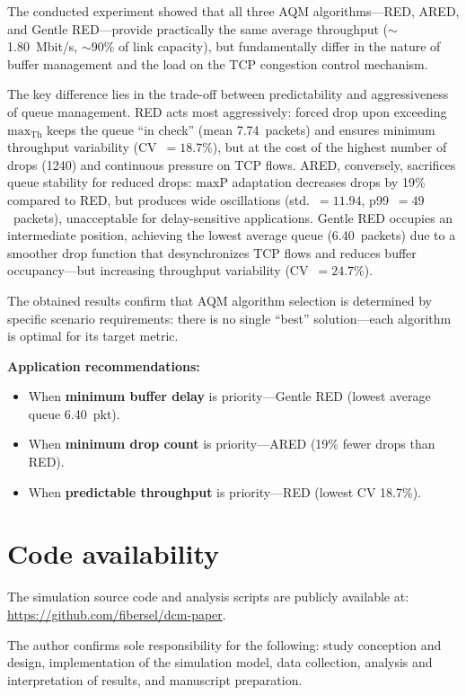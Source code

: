 \documentclass[default]{subfiles}
\begin{document}
{The conducted experiment showed that all three AQM algorithms---RED, ARED, and Gentle RED---provide practically the same average throughput ($\sim$1.80~Mbit/s, $\sim$90\% of link capacity), but fundamentally differ in the nature of buffer management and the load on the TCP congestion control mechanism.

The key difference lies in the trade-off between predictability and aggressiveness of queue management. RED acts most aggressively: forced drop upon exceeding $\mathrm{max}_{\mathrm{Th}}$ keeps the queue ``in check'' (mean 7.74~packets) and ensures minimum throughput variability (CV~$= 18.7\%$), but at the cost of the highest number of drops (1240) and continuous pressure on TCP flows. ARED, conversely, sacrifices queue stability for reduced drops: $\mathrm{maxP}$ adaptation decreases drops by 19\% compared to RED, but produces wide oscillations (std.~$= 11.94$, p99~$= 49$~packets), unacceptable for delay-sensitive applications. Gentle RED occupies an intermediate position, achieving the lowest average queue (6.40~packets) due to a smoother drop function that desynchronizes TCP flows and reduces buffer occupancy---but increasing throughput variability (CV~$= 24.7\%$).

The obtained results confirm that AQM algorithm selection is determined by specific scenario requirements: there is no single ``best'' solution---each algorithm is optimal for its target metric.

\textbf{Application recommendations:}
\begin{itemize}
  \item When \textbf{minimum buffer delay} is priority---Gentle RED (lowest average queue 6.40~pkt).
  \item When \textbf{minimum drop count} is priority---ARED (19\% fewer drops than RED).
  \item When \textbf{predictable throughput} is priority---RED (lowest CV 18.7\%).
\end{itemize}

\section*{Code availability}

The simulation source code and analysis scripts are publicly available at: \url{https://github.com/fibersel/dcm-paper}.

\begin{authorcontributions}
The author confirms sole responsibility for the following: study conception and design, implementation of the simulation model, data collection, analysis and interpretation of results, and manuscript preparation.
\end{authorcontributions}

}
\end{document}
